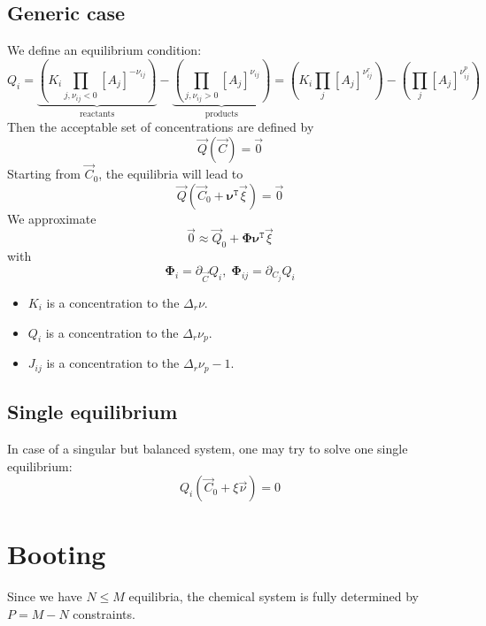 \documentclass[aps,12pt]{revtex4}
\newcommand{\trn}[1]{{#1}^{\mathtt{T}}}
\newcommand{\conc}[1]{{\left[#1\right]}}
\begin{document}
\subsection{Generic case}
We define an equilibrium condition:
\begin{equation}
	Q_i =  \underbrace{\left(K_i \prod_{j,\nu_{ij}<0} \conc{A_j}^{-\nu_{ij}}\right)}_{\text{reactants}} 
	- \underbrace{\left( \prod_{j,\nu_{ij}>0} \conc{A_j}^{\nu_{ij}}\right)}_{\text{products}}
	= \left(K_i \prod_{j} \conc{A_j}^{\nu^r_{ij}}\right)
	- \left( \prod_{j} \conc{A_j}^{\nu^p_{ij}}\right)  
\end{equation}
Then the acceptable set of concentrations are defined by
\begin{equation}
	\vec{Q}(\vec{C}) = \vec{0}
\end{equation}
Starting from $\vec{C}_0$, the equilibria will lead to
\begin{equation}
	\vec{Q}(\vec{C}_0+\trn{\bm{\nu}} \vec{\xi}) = \vec{0}
\end{equation}
We approximate
\begin{equation}
	\vec{0} \approx \vec{Q}_0 + \bm{\Phi} \trn{\bm{\nu}} \vec{\xi}
\end{equation}
with
\begin{equation}
	\bm{\Phi}_i = \partial_{\vec{C}} Q_i,\; \bm{\Phi}_{ij}= \partial_{C_j} Q_i
\end{equation}

\begin{itemize}
\item $K_i$ is a concentration to the $\Delta_r \nu$.
\item $Q_i$ is a concentration to the $\Delta_r \nu_p$.
\item $J_{ij}$ is a concentration to the $\Delta_r \nu_p-1$.
\end{itemize}

\subsection{Single equilibrium}
In case of a singular but balanced system, one may try to solve one single equilibrium:
\begin{equation}
Q_i\left(\vec{C}_0 + \xi \vec{\nu}\right) = 0
\end{equation}

\section{Booting}
Since we have $N\leq M$ equilibria, the chemical system is fully determined by
$P=M-N$ constraints.
\end{document}

